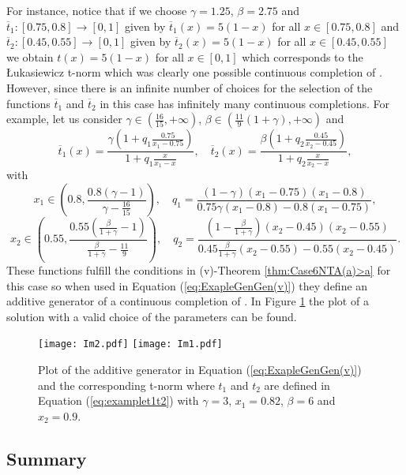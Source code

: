 \begin{example}
\begin{itemize}
\begin{itemize}
			
			For instance, notice that if we choose $\gamma=1.25$, $\beta=2.75$ and $\overline{t}_1:[0.75,0.8] \to [0,1]$ given by $\overline{t}_1(x)=5(1-x)$ for all  $x \in [0.75,0.8]$ and $\overline{t}_2:[0.45,0.55] \to [0,1]$ given by $\overline{t}_2(x)=5(1-x)$ for all $x \in [0.45,0.55]$ we obtain $t(x)=5(1-x)$ for all $x \in [0,1]$ which corresponds to the Łukasiewicz t-norm which was clearly one possible continuous completion of \TB. However, since there is an infinite number of choices for the selection of the functions $\overline{t}_1$ and $\overline{t}_2$ in this case \TB has infinitely many continuous completions. For example, let us consider $\gamma \in \left(\frac{16}{15},+\infty\right)$, $\beta \in \left(\frac{11}{9}(1+\gamma),+\infty\right)$ and
			\begin{equation}\label{eq:examplet1t2}
				\overline{t}_1(x)=\frac{\gamma \left(1+q_1\frac{0.75}{x_1-0.75}\right)}{1+q_1\frac{x}{x_1-x}}, \quad \overline{t}_2(x)=\frac{\beta \left(1+q_2\frac{0.45}{x_2-0.45}\right)}{1+q_2\frac{x}{x_2-x}},
			\end{equation}
			with
			$$x_1 \in \left(0.8,\frac{0.8(\gamma-1)}{\gamma-\frac{16}{15}}\right), \quad q_1=\frac{(1-\gamma)(x_1-0.75)(x_1-0.8)}{0.75\gamma(x_1-0.8)-0.8(x_1-0.75)},$$
			$$x_2 \in \left(0.55,\frac{0.55\left(\frac{\beta}{1+\gamma}-1\right)}{\frac{\beta}{1+\gamma}-\frac{11}{9}}\right), \quad  q_2=\frac{(1-\frac{\beta}{1+\gamma})(x_2-0.45)(x_2-0.55)}{0.45\frac{\beta}{1+\gamma}(x_2-0.55)-0.55(x_2-0.45)}.$$
			These functions fulfill the conditions in (v)-Theorem \ref{thm:Case6NTA(a)>a} for this case so when used in Equation (\ref{eq:ExapleGenGen(v)}) they define an additive generator of a continuous completion of \TB. In Figure  \ref{fig:nonuniquecompletions2} the plot of a solution with a valid choice of the parameters can be found.
			\begin{figure}[t]
				\centering
				\texttt{[image: Im2.pdf]}
				\texttt{[image: Im1.pdf]}
				\caption{Plot of the additive generator in Equation (\ref{eq:ExapleGenGen(v)}) and the corresponding t-norm where $t_1$ and $t_2$ are defined in Equation (\ref{eq:examplet1t2}) with $\gamma=3$, $x_1=0.82$, $\beta=6$ and $x_2=0.9$.}\label{fig:nonuniquecompletions2}
			\end{figure}
		\end{itemize}
	\end{itemize}
\end{example}
\pagebreak
\subsection{Summary}

